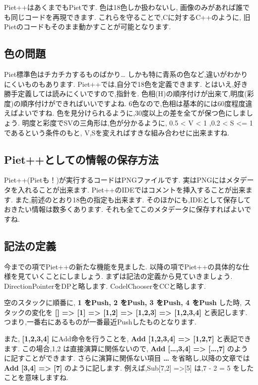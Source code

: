 Piet++はあくまでもPietです. 色は18色しか扱わないし,
画像のみがあれば誰でも同じコードを再現できます.
これらを守ることで,Cに対するC++のように,
旧Pietのコードもそのまま動かすことが可能となります.

\subsection{色の問題}

Piet標準色はチカチカするものばかり\ldots{}
しかも特に青系の色など,違いがわかりにくいものもあります.
Piet++では,自分で18色を定義できます.
とはいえ,好き勝手定義しては読みにくいですので,指針を.
色相(H)の順序付けが出来て,明度(彩度)の順序付けができればいいですよね.
6色なので,色相は基本的には60度程度違えばよいですね.
色を見分けられるように,30度以上の差を全てが保つ色にしましょう.
明度と彩度でSVの三角形は,色が分かるように, 0.5 \textless{} V \textless{}
1 ,0.2 \textless{} S \textless{}= 1であるという条件のもと,
V,Sを変えればすきな組み合わせに出来ますね.

\subsection{Piet++としての情報の保存方法}

Piet++(Pietも！)が実行するコードはPNGファイルです.
実はPNGにはメタデータを入れることが出来ます.
Piet++のIDEではコメントを挿入することが出来ます.
また,前述のとおり18色の指定も出来ます.
そのほかにも,IDEとして保存しておきたい情報は数多くあります.
それも全てこのメタデータに保存すればよいですね.

\subsection{記法の定義}

今までの項でPiet++の新たな機能を見ました.
以降の項でPiet++の具体的な仕様を見ていくことにしましょう.
まずは記法の定義から見ていきましょう. DirectionPointerをDPと略します.
CodelChooserをCCと略します.

空のスタックに順番に, \textbf{1 をPush, 2 をPush, 3 をPush, 4 をPush}
した時, スタックの変化を \textbf{{[}{]} =\textgreater{} {[}1{]}
=\textgreater{} {[}1,2{]} =\textgreater{} {[}1,2,3{]} =\textgreater{}
{[}1,2,3,4{]}} と表記します.
つまり,一番右にあるものが一番最近Pushしたものとなります.

また, \textbf{{[}1,2,3,4{]}} にAdd命令を行うことを, \textbf{Add
{[}1,2,3,4{]} =\textgreater{} {[}1,2,7{]}} と表記できます. この場合,1,2
は直接演算に関係ないので, \textbf{Add {[}\ldots{},3,4{]} =\textgreater{}
{[}\ldots{},7{]}} のように記すことができます. さらに演算に関係ない項目
\textbf{\ldots{}} を省略し,以降の文章では \textbf{Add {[}3,4{]}
=\textgreater{} {[}7{]}} のように記します. 例えば,Sub{[}7,2{]}
=\textgreater{}{[}5{]} は,7 - 2 = 5 をしたことを意味しますね.

